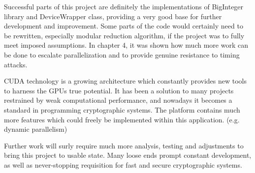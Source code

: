 \documentclass[oneside,openright,12pt,final,en]{mgr}
\begin{document}
Successful parts of this project are definitely the implementations of BigInteger library and DeviceWrapper class, providing a very good base for further development and improvement. Some parts of the code would certainly need to be rewritten, especially modular reduction algorithm, if the project was to fully meet imposed assumptions. In chapter 4, it was shown how much more work can be done to escalate parallelization and to provide genuine resistance to timing attacks.

CUDA technology is a growing architecture which constantly provides new tools to harness the GPUs true potential.
It has been a solution to many projects restrained by weak computational performance, and nowadays it becomes a standard in programming cryptographic systems. The platform contains much more features which could freely be implemented within this application. (e.g. dynamic parallelism\cite{dp})

Further work will surly require much more analysis, testing and adjustments to bring this project to usable state. Many loose ends prompt constant development, as well as never-stopping requisition for fast and secure cryptographic systems. 



 \listoffigures
 \listoftables
\end{document}

